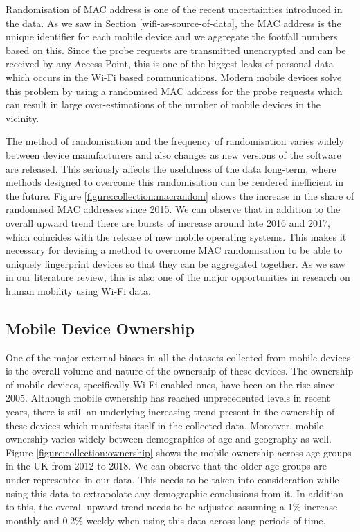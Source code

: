 Randomisation of MAC address is one of the recent uncertainties introduced in the data.
As we saw in Section \ref{wifi-as-source-of-data}, the MAC address is the unique identifier for each mobile device and we aggregate the footfall numbers based on this.
Since the probe requests are transmitted unencrypted and can be received by any Access Point, this is one of the biggest leaks of personal data which occurs in the Wi-Fi based communications.
Modern mobile devices solve this problem by using a randomised MAC address for the probe requests which can result in large over-estimations of the number of mobile devices in the vicinity.

The method of randomisation and the frequency of randomisation varies widely between device manufacturers and also changes as new versions of the software are released.
This seriously affects the usefulness of the data long-term, where methods designed to overcome this randomisation can be rendered inefficient in the future.
Figure \ref{figure:collection:macrandom} shows the increase in the share of randomised MAC addresses since 2015.
We can observe that in addition to the overall upward trend there are bursts of increase around late 2016 and 2017, which coincides with the release of new mobile operating systems.
This makes it necessary for devising a method to overcome MAC randomisation to be able to uniquely fingerprint devices so that they can be aggregated together.
As we saw in our literature review, this is also one of the major opportunities in research on human mobility using Wi-Fi data.

\subsection{Mobile Device Ownership}
One of the major external biases in all the datasets collected from mobile devices is the overall volume and nature of the ownership of these devices.
The ownership of mobile devices, specifically Wi-Fi enabled ones, have been on the rise since 2005.
Although mobile ownership has reached unprecedented levels in recent years, there is still an underlying increasing trend present in the ownership of these devices which manifests itself in the collected data.
Moreover, mobile ownership varies widely between demographies of age and geography as well. 
Figure \ref{figure:collection:ownership} shows the mobile ownership across age groups in the UK from 2012 to 2018.
We can observe that the older age groups are under-represented in our data.
This needs to be taken into consideration while using this data to extrapolate any demographic conclusions from it.
In addition to this, the overall upward trend needs to be adjusted assuming a 1\% increase monthly and 0.2\% weekly when using this data across long periods of time.

